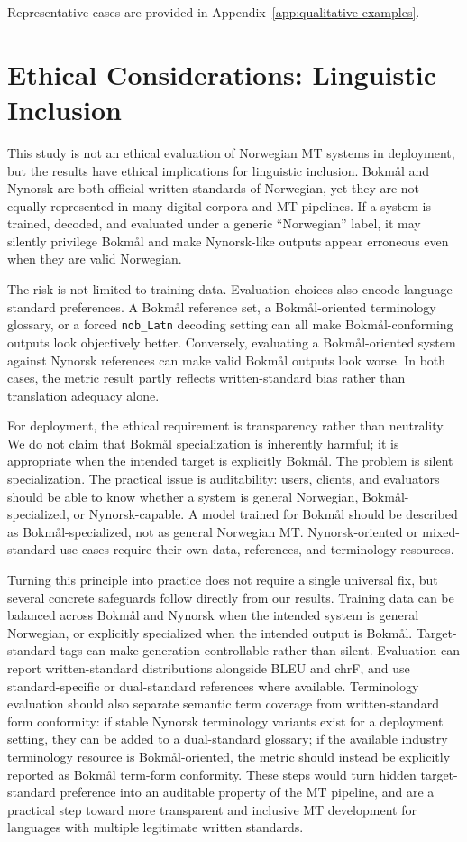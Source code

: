 \documentclass[11pt]{article}
\newcommand{\nb}{Bokm{\aa}l}
\newcommand{\nn}{Nynorsk}
\begin{document}
Representative cases are provided in Appendix~\ref{app:qualitative-examples}.

\section{Ethical Considerations: Linguistic Inclusion}

This study is not an ethical evaluation of Norwegian MT systems in deployment, but the results have ethical implications for linguistic inclusion. \nb{} and \nn{} are both official written standards of Norwegian, yet they are not equally represented in many digital corpora and MT pipelines. If a system is trained, decoded, and evaluated under a generic ``Norwegian'' label, it may silently privilege \nb{} and make \nn{}-like outputs appear erroneous even when they are valid Norwegian.

The risk is not limited to training data. Evaluation choices also encode language-standard preferences. A \nb{} reference set, a \nb{}-oriented terminology glossary, or a forced \texttt{nob\_Latn} decoding setting can all make \nb{}-conforming outputs look objectively better. Conversely, evaluating a \nb{}-oriented system against \nn{} references can make valid \nb{} outputs look worse. In both cases, the metric result partly reflects written-standard bias rather than translation adequacy alone.

For deployment, the ethical requirement is transparency rather than neutrality. We do not claim that \nb{} specialization is inherently harmful; it is appropriate when the intended target is explicitly \nb{}. The problem is silent specialization. The practical issue is auditability: users, clients, and evaluators should be able to know whether a system is general Norwegian, \nb{}-specialized, or \nn{}-capable. A model trained for \nb{} should be described as \nb{}-specialized, not as general Norwegian MT. \nn{}-oriented or mixed-standard use cases require their own data, references, and terminology resources.

Turning this principle into practice does not require a single universal fix, but several concrete safeguards follow directly from our results. Training data can be balanced across \nb{} and \nn{} when the intended system is general Norwegian, or explicitly specialized when the intended output is \nb{}. Target-standard tags can make generation controllable rather than silent. Evaluation can report written-standard distributions alongside BLEU and chrF, and use standard-specific or dual-standard references where available. Terminology evaluation should also separate semantic term coverage from written-standard form conformity: if stable \nn{} terminology variants exist for a deployment setting, they can be added to a dual-standard glossary; if the available industry terminology resource is \nb{}-oriented, the metric should instead be explicitly reported as \nb{} term-form conformity. These steps would turn hidden target-standard preference into an auditable property of the MT pipeline, and are a practical step toward more transparent and inclusive MT development for languages with multiple legitimate written standards.
\end{document}
